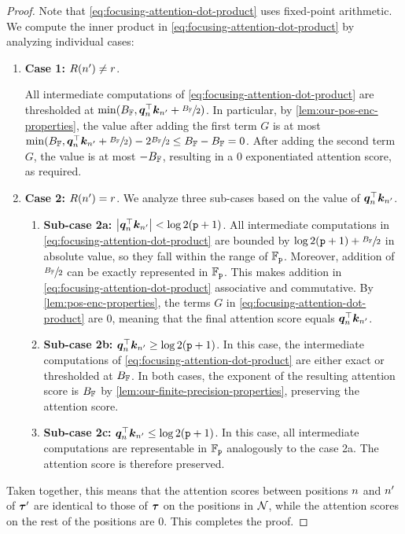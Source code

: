 \begin{proof}
   Note that \cref{eq:focusing-attention-dot-product} uses fixed-point arithmetic.
   We compute the inner product in \cref{eq:focusing-attention-dot-product} by analyzing individual cases:
   \begin{enumerate}[label=\arabic*.]
      \item \textbf{Case 1:} $R({{n}}') \neq r$.
      
      All intermediate computations of \cref{eq:focusing-attention-dot-product} are thresholded at $\min({{B_{{{\mathbb{F}}}}}}, {{{{{\bm{q}}}}_{{n}}^\top {{{\bm{k}}}}_{{{n}}'}}} + \sfrac{{{B_{{{\mathbb{F}}}}}}}{2})$.
      In particular, by \cref{lem:our-pos-enc-properties}, the value after adding the first term $G$ is at most $\min({{B_{{{\mathbb{F}}}}}}, {{{{{\bm{q}}}}_{{n}}^\top {{{\bm{k}}}}_{{{n}}'}}} + \sfrac{{{B_{{{\mathbb{F}}}}}}}{2}) - 2\sfrac{{{B_{{{\mathbb{F}}}}}}}{2} \leq {{B_{{{\mathbb{F}}}}}} -   {{B_{{{\mathbb{F}}}}}} = 0$.
      After adding the second term $G$, the value is at most $-{{B_{{{\mathbb{F}}}}}}$, resulting in a $0$ exponentiated attention score, as required.
      \item \textbf{Case 2:} $R({{n}}') = r$.
      We analyze three sub-cases based on the value of ${{{{{\bm{q}}}}_{{n}}^\top {{{\bm{k}}}}_{{{n}}'}}}$.
      
      \begin{enumerate}[label=\arabic*.]
         \item \textbf{Sub-case 2a:} ${{\left\lvert {{{{{\bm{q}}}}_{{n}}^\top {{{\bm{k}}}}_{{{n}}'}}} \right\rvert}} < \log{2} ({{\texttt{p}}} + 1)$.
         All intermediate computations in \cref{eq:focusing-attention-dot-product} are bounded by $\log{2} ({{\texttt{p}}} + 1) + \sfrac{{{B_{{{\mathbb{F}}}}}}}{2}$ in absolute value, so they fall within the range of ${{\mathbb{F}}}_{{\texttt{p}}}$. 
         Moreover, addition of $\sfrac{{{B_{{{\mathbb{F}}}}}}}{2}$ can be exactly represented in ${{\mathbb{F}}}_{{\texttt{p}}}$.
         This makes addition in \cref{eq:focusing-attention-dot-product} associative and commutative.
         By \cref{lem:pos-enc-properties}, the terms $G$ in \cref{eq:focusing-attention-dot-product} are $0$, meaning that the final attention score equals ${{{{{\bm{q}}}}_{{n}}^\top {{{\bm{k}}}}_{{{n}}'}}}$.
         \item \textbf{Sub-case 2b:} ${{{{{\bm{q}}}}_{{n}}^\top {{{\bm{k}}}}_{{{n}}'}}} \geq \log{2} ({{\texttt{p}}} + 1)$.
         In this case, the intermediate computations of \cref{eq:focusing-attention-dot-product} are either exact or thresholded at ${{B_{{{\mathbb{F}}}}}}$.
         In both cases, the exponent of the resulting attention score is ${{B_{{{\mathbb{F}}}}}}$ by \cref{lem:our-finite-precision-properties}, preserving the attention score.
         \item \textbf{Sub-case 2c:} ${{{{{\bm{q}}}}_{{n}}^\top {{{\bm{k}}}}_{{{n}}'}}} \leq \log{2} ({{\texttt{p}}} + 1)$.
         In this case, all intermediate computations are representable in ${{\mathbb{F}}}_{{\texttt{p}}}$ analogously to the case 2a.
         The attention score is therefore preserved.
      \end{enumerate}
   \end{enumerate}
   
   Taken together, this means that the attention scores between positions ${{n}}$ and ${{n}}'$ of ${{\boldsymbol{\tau}}}'$ are identical to those of ${{\boldsymbol{\tau}}}$ on the positions in ${{{\mathcal{N}}}}$, while the attention scores on the rest of the positions are $0$.
   This completes the proof.
\end{proof}

